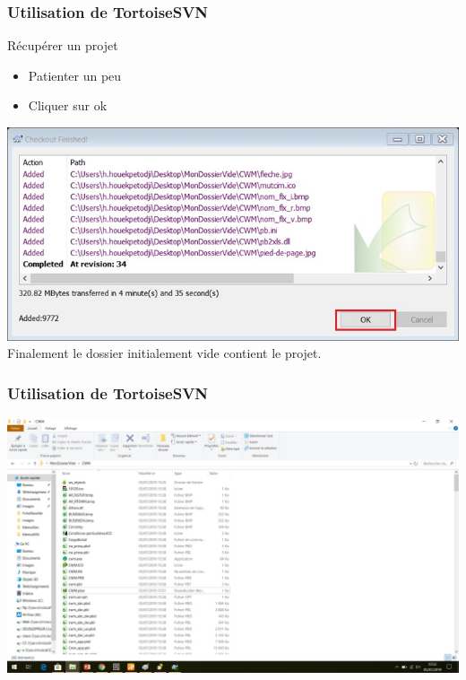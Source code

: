 \documentclass{beamer}
\begin{document}
\begin{frame}
\frametitle{Utilisation de TortoiseSVN}
\begin{block}{Récupérer un projet }
\begin{itemize}
\item Patienter un peu
\item Cliquer sur ok
\end{itemize}
\end{block}
\includegraphics[scale=0.3]{../images/checkout3.jpg}
\newline
\newline
\newline
Finalement le dossier initialement vide contient le projet.
\end{frame}

\begin{frame}
\frametitle{Utilisation de TortoiseSVN}
\includegraphics[scale=0.25]{../images/checkout4.jpg}
\end{frame}
\end{document}
